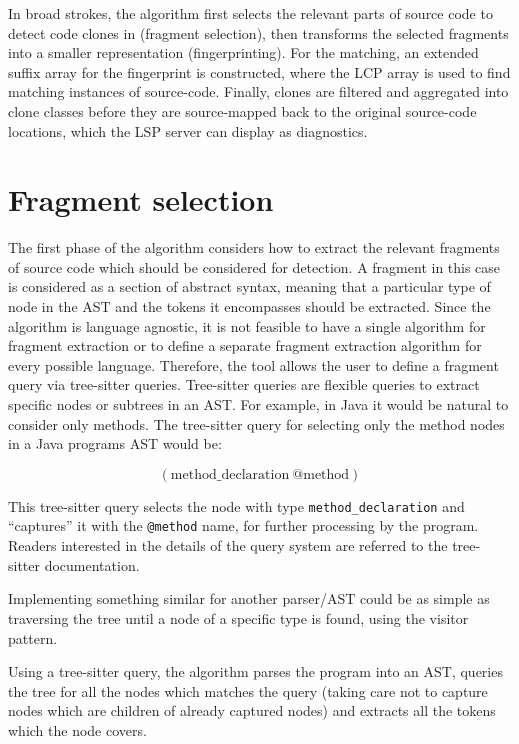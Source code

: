 In broad strokes, the algorithm first selects the relevant parts of source code to detect
code clones in (fragment selection), then transforms the selected fragments into a smaller
representation (fingerprinting). For the matching, an extended suffix array for the fingerprint
is constructed, where the LCP array is used to find matching instances of source-code.
Finally, clones are filtered and aggregated into clone classes before they are
source-mapped back to the original source-code locations, which the LSP server can display
as diagnostics.

\section{Fragment selection}

The first phase of the algorithm considers how to extract the relevant fragments of source
code which should be considered for detection. A fragment in this case is considered as a
section of abstract syntax, meaning that a particular type of node in the AST and the
tokens it encompasses should be extracted. Since the algorithm is language agnostic, it is
not feasible to have a single algorithm for fragment extraction or to define a separate
fragment extraction algorithm for every possible language. Therefore, the tool allows the
user to define a fragment query via tree-sitter queries\cite{treesitter}. Tree-sitter
queries are flexible queries to extract specific nodes or subtrees in an AST. For example,
in Java it would be natural to consider only methods. The tree-sitter query for selecting
only the method nodes in a Java programs AST would be:

\begin{equation}
    (\mathrm{method\_declaration\ } \text{@method})
\end{equation}

This tree-sitter query selects the node with type \verb|method_declaration| and
``captures'' it with the \verb|@method| name, for further processing by the program.
Readers interested in the details of the query system are referred to the tree-sitter
documentation\cite{treesitter}.

Implementing something similar for another parser/AST could be as simple as traversing
the tree until a node of a specific type is found, using the visitor pattern.

Using a tree-sitter query, the algorithm parses the program into an AST, queries the tree
for all the nodes which matches the query (taking care not to capture nodes which are
children of already captured nodes) and extracts all the tokens which the node covers.

